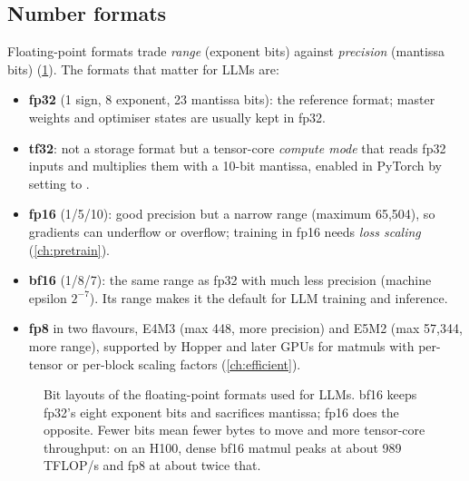 \subsection{Number formats}\label{sec:pytorch:formats}
Floating-point formats trade \emph{range} (exponent bits) against \emph{precision} (mantissa bits)
(\cref{fig:pytorch:formats}). The formats that matter for LLMs are:
\begin{itemize}
\item \textbf{fp32} (1 sign, 8 exponent, 23 mantissa bits): the reference format; master weights and
  optimiser states are usually kept in fp32.
\item \textbf{tf32}: not a storage format but a tensor-core \emph{compute mode} that reads fp32 inputs and
  multiplies them with a 10-bit mantissa, enabled in PyTorch by setting
   to .
\item \textbf{fp16} (1/5/10): good precision but a narrow range (maximum 65{,}504), so gradients can
  underflow or overflow; training in fp16 needs \emph{loss scaling} (\cref{ch:pretrain}).
\item \textbf{bf16} (1/8/7): the same range as fp32 with much less precision (machine epsilon $2^{-7}$). Its
  range makes it the default for LLM training and inference.
\item \textbf{fp8} in two flavours, E4M3 (max 448, more precision) and E5M2 (max 57{,}344, more range),
  supported by Hopper and later GPUs for matmuls with per-tensor or per-block scaling factors
  (\cref{ch:efficient}).
\end{itemize}

\begin{figure}[t]
\centering
{}
\caption{Bit layouts of the floating-point formats used for LLMs. bf16 keeps fp32's eight exponent bits and
sacrifices mantissa; fp16 does the opposite. Fewer bits mean fewer bytes to move and more tensor-core
throughput: on an H100, dense bf16 matmul peaks at about 989\,TFLOP/s and fp8 at about twice that.}
\label{fig:pytorch:formats}
\end{figure}

